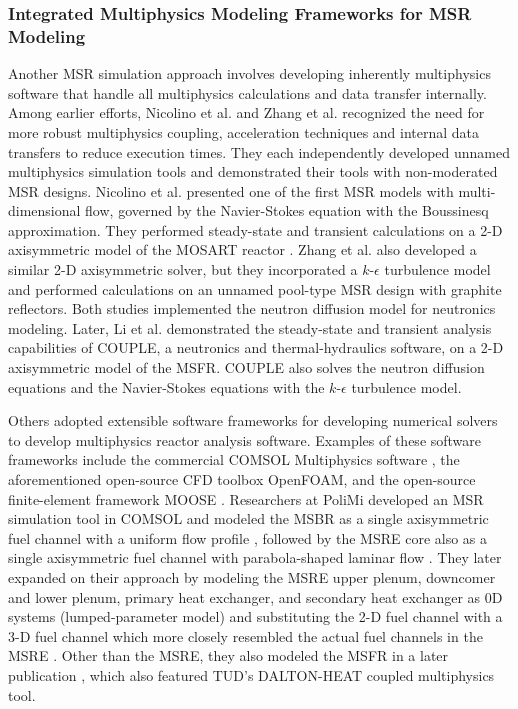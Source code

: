 \subsubsection{Integrated Multiphysics Modeling Frameworks for MSR Modeling}

Another \gls{MSR} simulation approach involves developing inherently multiphysics software that
handle all multiphysics calculations and data transfer internally. Among earlier efforts, Nicolino
et al. \cite{nicolino_coupled_2008} and Zhang et al. \cite{zhang_development_2009} recognized the
need for more robust multiphysics coupling, acceleration techniques and internal data transfers
to reduce execution times. They each independently developed unnamed multiphysics simulation tools
and demonstrated their tools with non-moderated \gls{MSR} designs. Nicolino et al. presented one of
the first \gls{MSR} models with multi-dimensional flow, governed by the Navier-Stokes equation with
the Boussinesq approximation. They performed steady-state and transient calculations on a 2-D
axisymmetric model of the \gls{MOSART} reactor \cite{ignatiev_molten_2014}. Zhang et al. also
developed a similar 2-D axisymmetric solver, but they incorporated a $k$-$\epsilon$ turbulence
model and performed calculations on an unnamed pool-type \gls{MSR} design with graphite reflectors.
Both studies implemented the neutron diffusion model for neutronics modeling.
Later, Li et al. \cite{li_transient_2015} demonstrated the
steady-state and transient analysis capabilities of COUPLE, a neutronics and
thermal-hydraulics software, on a 2-D axisymmetric model of the \gls{MSFR}. COUPLE also solves the
neutron diffusion equations and the Navier-Stokes equations with the $k$-$\epsilon$ turbulence
model.

Others adopted extensible software frameworks for developing numerical solvers
to develop multiphysics reactor analysis software. Examples of these software
frameworks include the commercial COMSOL
Multiphysics\textsuperscript{\textregistered} software
\cite{comsol_ab_comsol_nodate}, the aforementioned open-source CFD toolbox
OpenFOAM, and the open-source finite-element
framework \gls{MOOSE} \cite{gaston_physics-based_2015}. Researchers at
\gls{PoliMi} developed an \gls{MSR} simulation tool in COMSOL and
modeled the \gls{MSBR} as a single axisymmetric fuel channel with a uniform
flow profile \cite{cammi_multi-physics_2011}, followed by the \gls{MSRE} core
also as a single axisymmetric fuel channel with parabola-shaped laminar flow
\cite{cammi_dimensional_2012}. They later expanded on their approach by
modeling the \gls{MSRE} upper plenum, downcomer and lower plenum, primary heat
exchanger, and secondary heat exchanger as 0D systems (lumped-parameter model)
and substituting the 2-D fuel channel with a 3-D fuel channel which more closely
resembled the actual fuel channels in the \gls{MSRE}
\cite{zanetti_geometric_2015}. Other than the \gls{MSRE}, they also modeled the
\gls{MSFR} in a later publication \cite{fiorina_modelling_2014}, which also featured \gls{TUD}'s
DALTON-HEAT coupled multiphysics tool.


